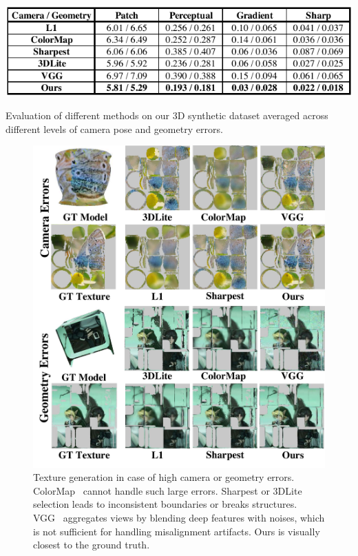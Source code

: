 \begin{table}
    \centering
    \includegraphics[width=0.8\linewidth]{texturegen/figures/synthetic-table.pdf}
    \caption{Evaluation of different methods on our 3D synthetic dataset averaged across different levels of camera pose and geometry errors.}
    \label{tab:toptim-cam-err}
\end{table}
\begin{figure}
\begin{minipage}{0.49\linewidth}
    \centering
    \includegraphics[width=\linewidth]{texturegen/figures/synth-results.pdf}
    \caption{Texture generation in case of high camera or geometry errors. ColorMap~\cite{zhou2014color} cannot handle such large errors. Sharpest or 3DLite~\cite{huang20173dlite} selection leads to inconsistent boundaries or breaks structures. VGG~\cite{johnson2016perceptual} aggregates views by blending deep features with noises, which is not sufficient for handling misalignment artifacts. Ours is visually closest to the ground truth.}

\end{minipage}
\end{figure}
